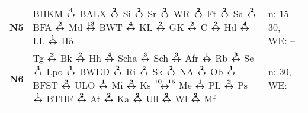 \begin{minipage}[t]{0.45\textwidth}
\begin{tabular}{>{\bfseries}L{1.2cm}L{9.0cm}L{3.0cm}}
\nbus{} N5    & BHKM $\xarwe{4}$ BALX $\xarwe{2}$ Si $\xarwe{2}$ Sr $\xarwe{2}$ WR $\xarwe{2}$ Ft $\xarwe{2}$ Sa $\xarwe{2}$ BFA $\xarwe{2}$ Md $\xarwe{13}$ BWT $\xarwe{4}$ KL     %
                $\xarwe{2}$ GK $\xarwe{2}$ C $\xarwe{2}$ Hd $\xarwe{4}$ LL $\xarwe{1}$ Hö                                                                                           & n: 15-30, WE: --           \\
\nbus{} N6    & Tg $\xarwe{2}$ Bk $\xarwe{2}$ Hh $\xarwe{4}$ Scha $\xarwe{3}$ Sch $\xarwe{3}$ Afr $\xarwe{1}$ Rb $\xarwe{3}$ Se $\xarwe{3}$ Lpo $\xarwe{1}$ BWED $\xarwe{2}$ Ri     %
                $\xarwe{2}$ Sk $\xarwe{2}$ NA $\xarwe{2}$ Ob $\xarwe{1}$ BFST $\xarwe{2}$ ULO $\xarwe{1}$ Mi $\xarwe{2}$ Ks $\xarwe{10-15}$ Me $\xarwe{1}$ PL $\xarwe{2}$ Ps        %
                $\xarwe{1}$ BTHF $\xarwe{2}$ At $\xarwe{2}$ Ka $\xarwe{2}$ Ull $\xarwe{2}$ Wl $\xarwe{2}$ Mf                                                                        & n: 30, WE: --              \\
\hline
\end{tabular}
\end{minipage}
\begin{minipage}[t]{0.05\textwidth}
\phantom{Tor}
\end{minipage}

